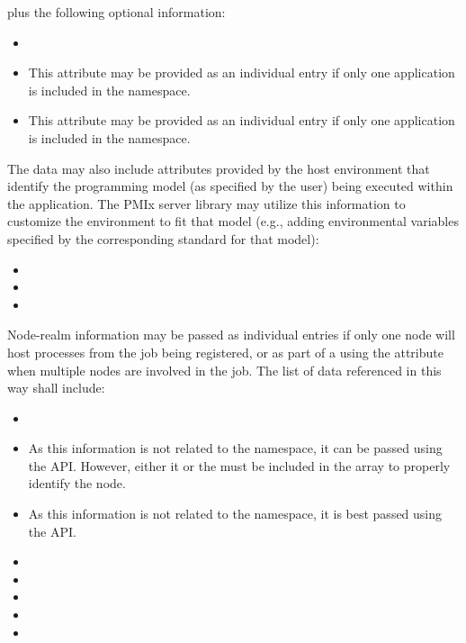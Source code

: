 plus the following optional information:

\begin{itemize}
    \item {}
    \item {}This attribute may be provided as an individual  entry if only one application is included in the namespace.
    \pasteAttributeItemEnd
    \item {}This attribute may be provided as an individual  entry if only one application is included in the namespace.
    \pasteAttributeItemEnd
\end{itemize}

The data may also include attributes provided by the host environment that identify the programming model (as specified by the user) being executed within the application. The \ac{PMIx} server library may utilize this information to customize the environment to fit that model (e.g., adding environmental variables specified by the corresponding standard for that model):

\begin{itemize}
    \item {}
    \item {}
    \item {}
\end{itemize}


Node-realm information may be passed as individual  entries if only one node will host processes from the job being registered, or as part of a  using the  attribute when multiple nodes are involved in the job. The list of data referenced in this way shall include:

\begin{itemize}
    \item {}
    \item {}As this information is not related to the namespace, it can be passed using the  \ac{API}. However, either it or the  must be included in the array to properly identify the node.
    \pasteAttributeItemEnd
    \item {}As this information is not related to the namespace, it is best passed using the  \ac{API}.
    \pasteAttributeItemEnd
    \item {}
    \item {}
    \item {}
    \item {}
    \item {}
\end{itemize}

